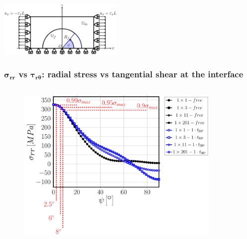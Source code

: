 \documentclass[first,firstsupp,lastsupp,last,hyperref,table]{ETHclass}
\begin{document}
\begin{frame}
\begin{columns}[c]
\begin{column}{0.5\textwidth}
\begin{figure}
\end{figure}
\end{column}
\end{columns}
\vspace{-0.25cm}
\includegraphics[width=0.45\textwidth]{refAngle.pdf}
\end{frame}

\addtocounter{framenumber}{-1}

\begin{frame}
\frametitle{\vspace{0.2cm}\small $\mathbf{\sigma_{rr}}$ vs $\mathbf{\tau_{r\theta}}$: radial stress vs tangential shear at the interface}
\vspace{-.75cm}
\centering
\begin{columns}[c]
\centering
\begin{column}{0.5\textwidth}
\centering
\begin{figure}
\centering
\includegraphics[width=\columnwidth]{vf60-nodamage-sigmar.pdf}
\end{figure}
\end{column}
\begin{column}{0.5\textwidth}
\centering
\begin{figure}
\centering

\end{figure}
\end{column}
\end{columns}
\end{frame}
\end{document}
